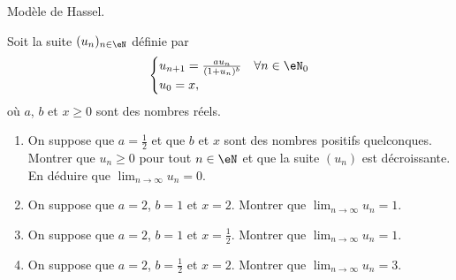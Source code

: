 
\begin{exercice}\label{exoTD3-0009}

	Modèle de Hassel.

	Soit la suite $(u_n)_{n\in\eN}$ définie par
	\begin{equation}
		\begin{cases}
			u_{n+1}=\frac{ au_n }{ (1+u_n)^b }	&	\forall n\in\eN_0\\
			u_0=x,
		\end{cases}
	\end{equation}
	où $a$, $b$ et $x\geq 0$ sont des nombres réels.
	\begin{enumerate}
		\item
			On suppose que $a=\frac{ 1 }{2}$ et que $b$ et $x$ sont des nombres positifs quelconques. Montrer que $u_n\geq 0$ pour tout $n\in\eN$ et que la suite $(u_n)$ est décroissante. En déduire que $\lim_{n\to\infty}u_n=0$.
		\item
			On suppose que $a=2$, $b=1$ et $x=2$. Montrer que $\lim_{n\to\infty}u_n=1$.
		\item
			On suppose que $a=2$, $b=1$ et $x=\frac{ 1 }{2}$. Montrer que $\lim_{n\to\infty}u_n=1$.
		\item
			On suppose que $a=2$, $b=\frac{ 1 }{2}$ et $x=2$. Montrer que $\lim_{n\to\infty}u_n=3$.
	\end{enumerate}

\end{exercice}
